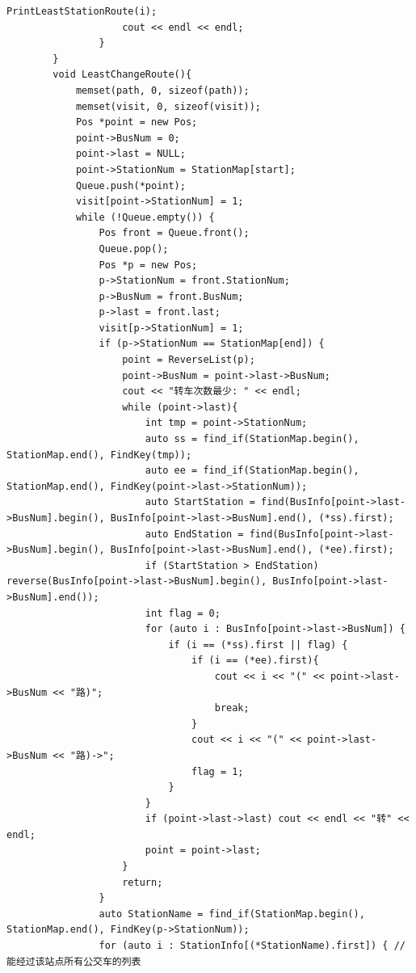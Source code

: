 \documentclass[a4paper,11pt,UTF8]{ctexart}
\begin{document}
\begin{lstlisting}[caption=BusRoute.cpp,captionpos=b]
                    PrintLeastStationRoute(i);
                    cout << endl << endl;
                }
        }
        void LeastChangeRoute(){
            memset(path, 0, sizeof(path));
            memset(visit, 0, sizeof(visit));
            Pos *point = new Pos;
            point->BusNum = 0;
            point->last = NULL;
            point->StationNum = StationMap[start];
            Queue.push(*point);
            visit[point->StationNum] = 1;
            while (!Queue.empty()) {
                Pos front = Queue.front();
                Queue.pop();
                Pos *p = new Pos;
                p->StationNum = front.StationNum;
                p->BusNum = front.BusNum;
                p->last = front.last;
                visit[p->StationNum] = 1;
                if (p->StationNum == StationMap[end]) {
                    point = ReverseList(p);
                    point->BusNum = point->last->BusNum;
                    cout << "转车次数最少: " << endl;
                    while (point->last){
                        int tmp = point->StationNum;
                        auto ss = find_if(StationMap.begin(), StationMap.end(), FindKey(tmp));
                        auto ee = find_if(StationMap.begin(), StationMap.end(), FindKey(point->last->StationNum));
                        auto StartStation = find(BusInfo[point->last->BusNum].begin(), BusInfo[point->last->BusNum].end(), (*ss).first);
                        auto EndStation = find(BusInfo[point->last->BusNum].begin(), BusInfo[point->last->BusNum].end(), (*ee).first);
                        if (StartStation > EndStation) reverse(BusInfo[point->last->BusNum].begin(), BusInfo[point->last->BusNum].end());
                        int flag = 0;
                        for (auto i : BusInfo[point->last->BusNum]) {
                            if (i == (*ss).first || flag) {
                                if (i == (*ee).first){
                                    cout << i << "(" << point->last->BusNum << "路)";
                                    break;
                                }
                                cout << i << "(" << point->last->BusNum << "路)->";
                                flag = 1;
                            }
                        }
                        if (point->last->last) cout << endl << "转" << endl;
                        point = point->last;
                    }
                    return;
                }
                auto StationName = find_if(StationMap.begin(), StationMap.end(), FindKey(p->StationNum));
                for (auto i : StationInfo[(*StationName).first]) { //能经过该站点所有公交车的列表

\end{lstlisting}
\end{document}
